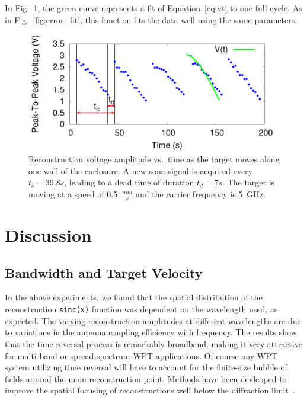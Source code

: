 \documentclass[conference]{IEEEtran}
\begin{document}
In Fig.~\ref{fig:moving_recon}, the green curve represents a fit of
Equation~\ref{eq:vt} to one full cycle. As in Fig.~\ref{fig:error_fit}, this
function fits the data well using the same parameters.



\begin{figure}[t]
\centering
\includegraphics[width=\columnwidth]{figs/moving_recon.pdf}
\caption{Reconstruction voltage amplitude vs.\ time as the target moves along
one wall of the enclosure. A new sona signal is acquired every $t_{c}=39.8s$,
leading to a dead time of duration $t_{d}=7s$. The target is moving at a speed
of 0.5~$\frac{mm}{s}$ and the carrier frequency is 5~GHz.}
\label{fig:moving_recon}
\end{figure}


\section{Discussion}

\subsection{Bandwidth and Target Velocity}
\label{sec:bandwidth}


In the above experiments, we found that the spatial distribution of the
reconstruction \texttt{sinc(x)} function was dependent on the wavelength used,
as expected.
%
The varying reconstruction amplitudes at different wavelengths are due to
variations in the antenna coupling efficiency with frequency.
%
The results show that the time reversal process is remarkably broadband, making
it very attractive for multi-band or spread-spectrum WPT applications.
%
Of course any WPT system utilizing time reversal will have to account for the
finite-size bubble of fields around the main reconstruction point.
%
Methods have been devleoped to improve the spatial focusing of reconstructions
well below the diffraction limit~\cite{lerosey-focusing}.
\end{document}
